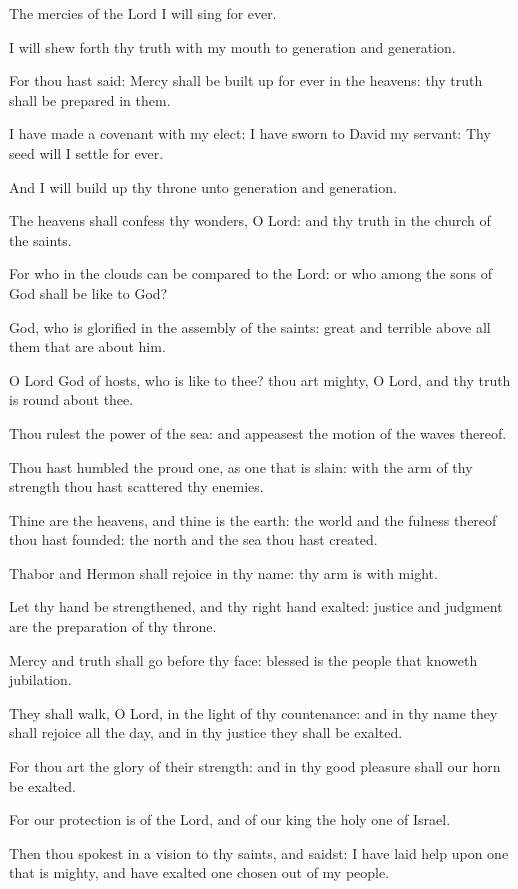 ﻿\item The mercies of the Lord I will sing for ever.
\item I will shew forth thy truth with my mouth to generation and generation.
\item For thou hast said: Mercy shall be built up for ever in the heavens: thy truth shall be prepared in them.
\item I have made a covenant with my elect: I have sworn to David my servant: Thy seed will I settle for ever.
\item And I will build up thy throne unto generation and generation.
\item The heavens shall confess thy wonders, O Lord: and thy truth in the church of the saints.
\item For who in the clouds can be compared to the Lord: or who among the sons of God shall be like to God?
\item God, who is glorified in the assembly of the saints: great and terrible above all them that are about him.
\item O Lord God of hosts, who is like to thee? thou art mighty, O Lord, and thy truth is round about thee.
\item Thou rulest the power of the sea: and appeasest the motion of the waves thereof.
\item Thou hast humbled the proud one, as one that is slain: with the arm of thy strength thou hast scattered thy enemies.
\item Thine are the heavens, and thine is the earth: the world and the fulness thereof thou hast founded: the north and the sea thou hast created.
\item Thabor and Hermon shall rejoice in thy name: thy arm is with might.
\item Let thy hand be strengthened, and thy right hand exalted: justice and judgment are the preparation of thy throne.
\item Mercy and truth shall go before thy face: blessed is the people that knoweth jubilation.
\item They shall walk, O Lord, in the light of thy countenance: and in thy name they shall rejoice all the day, and in thy justice they shall be exalted.
\item For thou art the glory of their strength: and in thy good pleasure shall our horn be exalted.
\item For our protection is of the Lord, and of our king the holy one of Israel.
\item Then thou spokest in a vision to thy saints, and saidst: I have laid help upon one that is mighty, and have exalted one chosen out of my people. 
